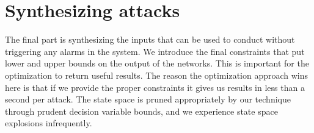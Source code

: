 \label{section:cost function}
\section{Synthesizing attacks}
The final part is synthesizing the inputs that can be used to conduct \attack without triggering any alarms in the system. We introduce the final constraints that put lower and upper bounds on the output of the networks. This is important for the optimization to return useful results. The reason the optimization approach wins here is that if we provide the proper constraints it gives us results in less than a second per attack. The state space is pruned appropriately by our technique through prudent decision variable bounds, and we experience state space explosions infrequently.
